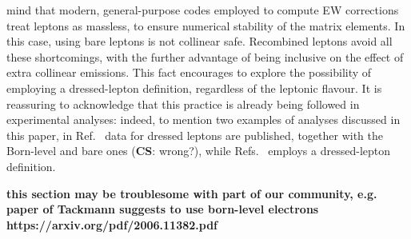 mind that modern, general-purpose codes employed to
compute EW corrections treat leptons as massless, to ensure numerical stability of the matrix elements. In this case, using bare leptons is not collinear safe. Recombined
leptons avoid all these shortcomings, with the further advantage of being 
inclusive on the effect of extra collinear emissions. This fact encourages to explore the possibility of employing a dressed-lepton
definition, regardless of the leptonic flavour. It is reassuring to acknowledge that this practice is already being followed in experimental analyses:
indeed, to mention two examples of analyses discussed in this paper, in Ref.~\cite{Aad:2015auj} data for dressed leptons are published, together with the Born-level
and bare ones (\textbf{CS}: wrong?), while Refs.~\cite{Sirunyan:2019bzr} employs a dressed-lepton definition.

{\bf this section may be troublesome with part of our community, e.g. paper of Tackmann suggests to use born-level electrons https://arxiv.org/pdf/2006.11382.pdf}
